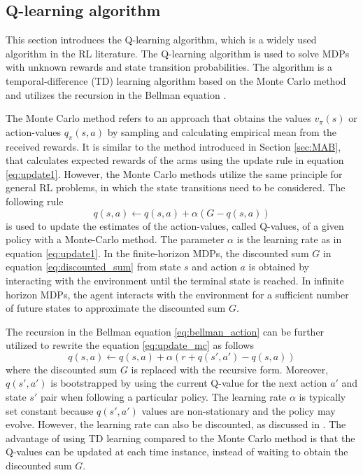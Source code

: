 \documentclass[english, 12pt, a4paper, elec, utf8, a-1b, online]{aaltothesis}
\numberwithin{equation}{section}
\begin{document}
\subsection{Q-learning algorithm}\label{sec:q_learning}

This section introduces the Q-learning algorithm, which is a widely used algorithm in the RL literature.
The Q-learning algorithm is used to solve MDPs with unknown rewards and state transition probabilities.
The algorithm is a temporal-difference (TD) learning algorithm based on the Monte Carlo method and utilizes the recursion in the Bellman equation \cite{Sutton2018}.

The Monte Carlo method refers to an approach that obtains the values $v_\pi(s)$ or action-values $q_\pi(s, a)$ by sampling and calculating empirical mean from the received rewards. 
It is similar to the method introduced in Section \ref{sec:MAB}, that calculates expected rewards of the arms using the update rule in equation \eqref{eq:update1}. 
However, the Monte Carlo methods utilize the same principle for general RL problems, in which the state transitions need to be considered. 
The following rule \cite{Sutton2018}
\begin{equation}\label{eq:update_mc}
    q(s, a) \leftarrow q(s, a) + \alpha (G - q(s, a))
\end{equation}
is used to update the estimates of the action-values, called Q-values, of a given policy with a Monte-Carlo method.
The parameter $\alpha$ is the learning rate as in equation \eqref{eq:update1}.
In the finite-horizon MDPs, the discounted sum $G$ in equation \eqref{eq:discounted_sum} from state $s$ and action $a$ is obtained by interacting with the environment until the terminal state is reached.   
In infinite horizon MDPs, the agent interacts with the environment for a sufficient number of future states to approximate the discounted sum $G$.


The recursion in the Bellman equation \eqref{eq:bellman_action} can be further utilized to rewrite the equation \eqref{eq:update_mc} as follows \cite{Sutton2018}
\begin{equation}\label{eq:update_td}
    q(s, a) \leftarrow q(s, a) + \alpha \left( r + q(s', a') - q(s, a) \right)
\end{equation}
where the discounted sum $G$ is replaced with the recursive form.
Moreover, $q(s', a')$ is bootstrapped by using the current Q-value for the next action $a'$ and state $s'$ pair when following a particular policy.
The learning rate $\alpha$ is typically set constant because $q(s', a')$ values are non-stationary and the policy may evolve.
However, the learning rate can also be discounted, as discussed in \cite{Even-Dar2003}.
The advantage of using TD learning compared to the Monte Carlo method is that the Q-values can be updated at each time instance, instead of waiting to obtain the discounted sum $G$.
\end{document}
